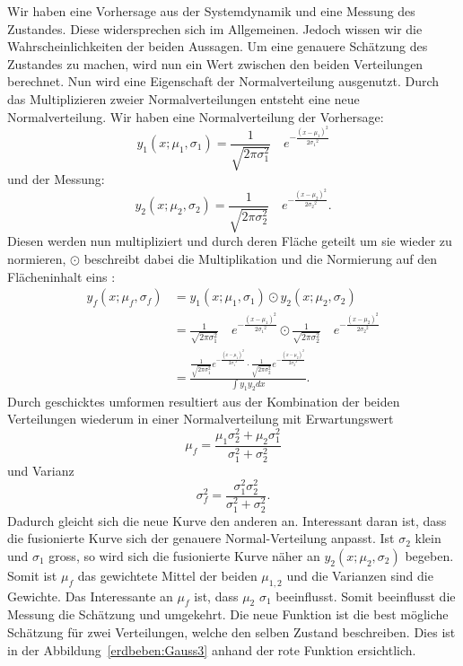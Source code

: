 Wir haben eine Vorhersage aus der Systemdynamik und eine Messung des Zustandes.
Diese widersprechen sich im Allgemeinen. 
Jedoch wissen wir die Wahrscheinlichkeiten der beiden Aussagen. 
Um eine genauere Schätzung des Zustandes zu machen, wird nun ein Wert zwischen den beiden Verteilungen berechnet. 
Nun wird eine Eigenschaft der Normalverteilung ausgenutzt. Durch das Multiplizieren zweier Normalverteilungen entsteht eine neue Normalverteilung. 
Wir haben eine Normalverteilung der Vorhersage:
\[ 
{y_1}(x;{\mu_1},{\sigma_1})=\frac{1}{\sqrt{2\pi\sigma_1^2}}\quad e^{-\frac{(x-{\mu_1})^2}{2{\sigma_1}^2}} 
\]
und der Messung:
\[ 
{y_2}(x;{\mu_2},{\sigma_2})=\frac{1}{\sqrt{2\pi\sigma_2^2}}\quad e^{-\frac{(x-{\mu_2})^2}{2{\sigma_2}^2}}.
\]
Diesen werden nun multipliziert und durch deren Fläche geteilt um sie wieder zu normieren, $\odot$ beschreibt dabei die Multiplikation und die Normierung auf den Flächeninhalt eins :
\begin{align*}
	{y_f}(x; {\mu_f}, {\sigma_f}) 
	&=
	 {y_1}(x;{ \mu_1},{ \sigma_1}) \odot {y_2}(x; {\mu_2}, {\sigma_2})
	\\
	&=
	\frac{1}{\sqrt{2\pi\sigma_1^2}}\quad e^{-\frac{(x-{\mu_1})^2}{2{\sigma_1}^2}} \odot \frac{1}{\sqrt{2\pi\sigma_2^2}}\quad e^{-\frac{(x-{\mu_2})^2}{2{\sigma_2}^2}}
	\\
	&=
	\frac{ \frac{1}{\sqrt{2\pi\sigma_1^2}}e^{-\frac{(x-{\mu_1})^2}{2{\sigma_1}^2}} \cdot \frac{1}{\sqrt{2\pi\sigma_2^2}}e^{-\frac{(x-{\mu_2})^2}{2{\sigma_2}^2}}}{\int {y_1} {y_2} dx}.
\end{align*}
Durch geschicktes umformen resultiert aus der Kombination der beiden Verteilungen wiederum in einer Normalverteilung
mit Erwartungswert
\[ \mu_f = \frac{\mu_1\sigma_2^2 + \mu_2 \sigma_1^2}{\sigma_1^2 + \sigma_2^2} \]
und Varianz
\[
\sigma_f^2 = \frac{\sigma_1^2 \sigma_2^2}{\sigma_1^2 + \sigma_2^2}.
\]
Dadurch gleicht sich die neue Kurve den anderen an. Interessant daran ist, dass die fusionierte Kurve sich der genauere Normal-Verteilung anpasst.
Ist ${\sigma_2}$ klein und ${\sigma_1}$ gross, so wird sich die fusionierte Kurve näher an ${y_2}(x;{\mu_2},{\sigma_2})$ begeben.
Somit ist $\mu_f$ das gewichtete Mittel der beiden $\mu_{1,2}$ und die Varianzen sind die Gewichte. 
Das Interessante an $\mu_{f}$ ist, dass ${\mu_2}$  ${\sigma_1}$ beeinflusst. 
Somit beeinflusst die Messung die Schätzung und umgekehrt.
Die neue Funktion ist die best mögliche Schätzung für zwei Verteilungen, welche den selben Zustand beschreiben. 
Dies ist in der Abbildung~\ref{erdbeben:Gauss3} anhand der rote Funktion ersichtlich. 
